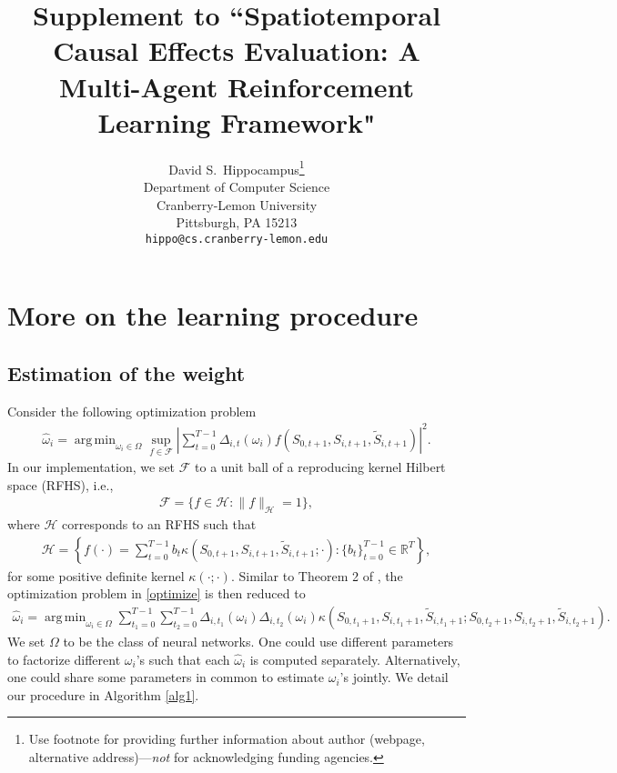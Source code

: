 \documentclass{article}
\title{Supplement to ``Spatiotemporal Causal Effects Evaluation: A Multi-Agent Reinforcement Learning Framework"}
\author{%
	David S.~Hippocampus\thanks{Use footnote for providing further information
		about author (webpage, alternative address)---\emph{not} for acknowledging
		funding agencies.} \\
	Department of Computer Science\\
	Cranberry-Lemon University\\
	Pittsburgh, PA 15213 \\
	\texttt{hippo@cs.cranberry-lemon.edu} \\
}
\DeclareMathOperator*{\argmin}{arg\,min}
\begin{document}
	
\maketitle

\appendix 
\section{More on the learning procedure}
\subsection{Estimation of the weight}\label{sec:weight}
Consider the following optimization problem
\begin{eqnarray}\label{optimize}
	\widehat{\omega}_i=\argmin_{\omega_i\in \Omega} \sup_{f\in \mathcal{F}} \left|\sum_{t=0}^{T-1} \Delta_{i,t}(\omega_i) f(S_{0,t+1},S_{i,t+1},\widetilde{S}_{i,t+1})\right|^2.
\end{eqnarray}
In our implementation, we set $\mathcal{F}$ to a unit ball of a reproducing kernel Hilbert space (RFHS), i.e., 
\begin{eqnarray*}
	\mathcal{F}=\{f\in \mathcal{H}:\|f\|_{\mathcal{H}}=1\},
\end{eqnarray*}
where $\mathcal{H}$ corresponds to an RFHS such that
\begin{eqnarray*}
	\mathcal{H}=\left\{f(\cdot)=\sum_{t=0}^{T-1} b_t \kappa(S_{0,t+1},S_{i,t+1},\widetilde{S}_{i,t+1};\cdot): \{b_t\}_{t=0}^{T-1}\in \mathbb{R}^{T} \right\},
\end{eqnarray*}
for some positive definite kernel $\kappa(\cdot;\cdot)$. Similar to Theorem 2 of \cite{liu2018}, the optimization problem in \eqref{optimize} is then reduced to 
\begin{eqnarray*}
	\widehat{\omega}_i=\argmin_{\omega_i\in \Omega} \sum_{t_1=0}^{T-1} \sum_{t_2=0}^{T-1} \Delta_{i,t_1}(\omega_i)\Delta_{i,t_2}(\omega_i) \kappa(S_{0,t_1+1},S_{i,t_1+1},\widetilde{S}_{i,t_1+1};S_{0,t_2+1},S_{i,t_2+1},\widetilde{S}_{i,t_2+1}). 
\end{eqnarray*}
We set $\Omega$ to be the class of neural networks. One could use different parameters to factorize different $\omega_i$'s such that each $\widehat{\omega}_i$ is computed separately. Alternatively, one could share some parameters in common to estimate $\omega_i$'s jointly. We detail our procedure in Algorithm \ref{alg1}. 
\end{document}
